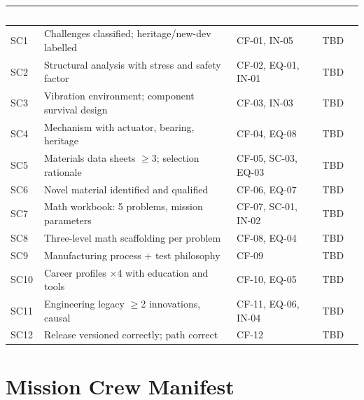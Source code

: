 \documentclass[11pt,letterpaper]{article}
\newcommand{\tableheader}[1]{\textbf{\sffamily\textcolor{white}{#1}}}
\begin{document}
\begin{center}
\begin{tabularx}{\textwidth}{L{1cm}L{5cm}L{3cm}C{1.5cm}}
\toprule
{}
\tableheader{SC\#} & \tableheader{Criterion} & \tableheader{Test IDs} & \tableheader{Status} \\
\midrule
SC1 & Challenges classified; heritage/new-dev labelled & CF-01, IN-05 & TBD \\
SC2 & Structural analysis with stress and safety factor & CF-02, EQ-01, IN-01 & TBD \\
SC3 & Vibration environment; component survival design & CF-03, IN-03 & TBD \\
SC4 & Mechanism with actuator, bearing, heritage & CF-04, EQ-08 & TBD \\
SC5 & Materials data sheets $\geq$3; selection rationale & CF-05, SC-03, EQ-03 & TBD \\
SC6 & Novel material identified and qualified & CF-06, EQ-07 & TBD \\
SC7 & Math workbook: 5 problems, mission parameters & CF-07, SC-01, IN-02 & TBD \\
SC8 & Three-level math scaffolding per problem & CF-08, EQ-04 & TBD \\
SC9 & Manufacturing process + test philosophy & CF-09 & TBD \\
SC10 & Career profiles $\times$4 with education and tools & CF-10, EQ-05 & TBD \\
SC11 & Engineering legacy $\geq$2 innovations, causal & CF-11, EQ-06, IN-04 & TBD \\
SC12 & Release versioned correctly; path correct & CF-12 & TBD \\
\bottomrule
\end{tabularx}
\end{center}

\section{Mission Crew Manifest}
\end{document}
